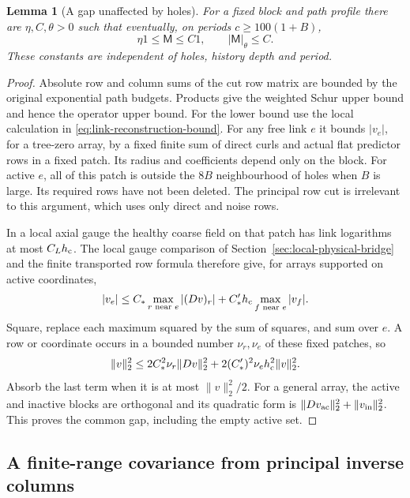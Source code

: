 \documentclass[11pt,reqno]{amsart}
\numberwithin{equation}{section}
\newtheorem{lemma}[theorem]{Lemma}
\theoremstyle{definition}
\theoremstyle{remark}
\begin{document}
\begin{lemma}[A gap unaffected by holes]
\label{lem:physical-selected-gap}
For a fixed block and path profile there are \(\eta,C,\theta>0\)
such that eventually, on periods \(c\ge100(1+B)\),
\[
                 \eta1\le\mathsf M\le C1,\qquad
                                  |\mathsf M|_\theta\le C.
\]
These constants are independent of holes, history depth and period.
\end{lemma}
\begin{proof}
Absolute row and column sums of the cut row matrix are bounded
by the original exponential path budgets. Products give the
weighted Schur upper bound and hence the operator upper bound.
For the lower bound use the local calculation in
\eqref{eq:link-reconstruction-bound}. For any free link \(e\)
it bounds \(|v_e|\), for a tree-zero array, by a fixed finite
sum of direct curls and actual flat predictor rows in a fixed
patch. Its radius and coefficients depend only on the block.
For active \(e\), all of this patch is outside the \(8B\)
neighbourhood of holes when \(B\) is large. Its required rows
have not been deleted. The principal row cut is irrelevant to
this argument, which uses only direct and noise rows.

In a local axial gauge the healthy coarse field on that patch
has link logarithms at most \(C_Lh_{\rm c}\). The local gauge
comparison of Section~\ref{sec:local-physical-bridge} and the
finite transported row formula therefore give, for arrays
supported on active coordinates,
\[
 |v_e|\le C_*\max_{r\text{ near }e}|(Dv)_r|
                 +C_*'h_{\rm c}\max_{f\text{ near }e}|v_f|.
\]
Square, replace each maximum squared by the sum of squares,
and sum over \(e\). A row or coordinate occurs in a bounded
number \(\nu_r,\nu_e\) of these fixed patches, so
\[
 \|v\|_2^2\le2C_*^2\nu_r\|Dv\|_2^2
                     +2(C_*')^2\nu_e h_{\rm c}^2\|v\|_2^2.
\]
Absorb the last term when it is at most \(\|v\|_2^2/2\).
For a general array, the active and inactive blocks are
orthogonal and its quadratic form is
\(\|Dv_{\rm ac}\|_2^2+\|v_{\rm in}\|_2^2\).
This proves the common gap, including the empty active set.
\end{proof}

\subsection{A finite-range covariance from principal inverse columns}
\end{document}
